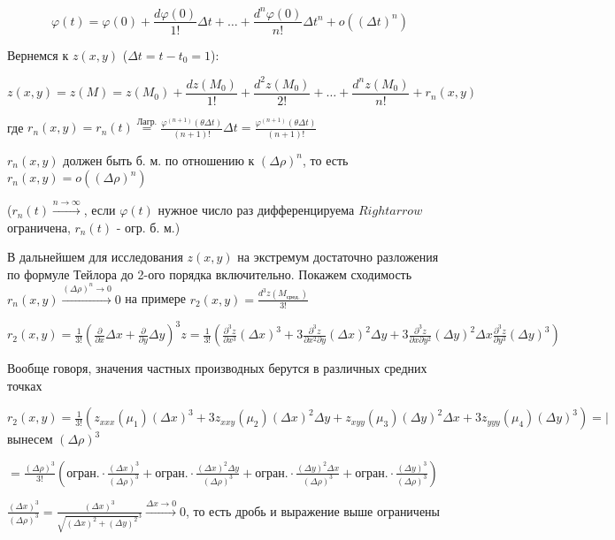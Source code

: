 \documentclass[12pt]{article}
\begin{document}
    \[\varphi(t) = \varphi(0) + \frac{d\varphi(0)}{1!} \Delta t + \dots + \frac{d^{n}\varphi(0)}{n!} \Delta t^n + o((\Delta t)^n)\]

    Вернемся к $z(x, y)$ ($\Delta t = t - t_0 = 1$):

    \[z(x, y) = z(M) = z(M_0) + \frac{dz(M_0)}{1!} + \frac{d^2 z(M_0)}{2!} + \dots + \frac{d^n z(M_0)}{n!} + r_n(x, y)\]

    где $r_n(x, y) = r_n(t) \stackrel{\text{Лагр.}}{=} \frac{\varphi^{(n+1)}(\theta \Delta t)}{(n + 1)!} \Delta t = \frac{\varphi^{(n+1)}(\theta \Delta t)}{(n + 1)!}$

    $r_n(x, y)$ должен быть б. м. по отношению к $(\Delta \rho)^n$, то есть $r_n(x, y) = o((\Delta \rho)^n)$

    ($r_n(t) \stackrel{n \to \infty}{\rightarrow}$, если $\varphi(t)$ нужное число раз дифференцируема $Rightarrow$ ограничена, $r_n(t)$ - огр. б. м.)

    \Nota В дальнейшем для исследования $z(x, y)$ на экстремум достаточно разложения по формуле Тейлора до 2-ого порядка включительно.
    Покажем сходимость $r_n(x, y) \stackrel{(\Delta \rho)^n \to 0}{\rightarrow} 0$ на примере $\displaystyle r_2 (x, y) = \frac{d^3 z(M_{\text{сред.}})}{3!}$


    $r_2(x, y) = \frac{1}{3!} \left(\frac{\partial}{\partial x} \Delta x + \frac{\partial}{\partial y} \Delta y\right)^3 z =
    \frac{1}{3!} \left(\frac{\partial^3 z}{\partial x^3} (\Delta x)^3 + 3 \frac{\partial^3 z}{\partial x^2 \partial y} (\Delta x)^2 \Delta y +
    3 \frac{\partial^3 z}{\partial x \partial y^2} (\Delta y)^2 \Delta x \frac{\partial^3 z}{\partial y^3} (\Delta y)^3\right)$

    Вообще говоря, значения частных производных берутся в различных средних точках

    $r_2(x, y) = \frac{1}{3!} (z_{xxx}(\mu_1)(\Delta x)^3 + 3 z_{xxy}(\mu_2)(\Delta x)^2 \Delta y + z_{xyy}(\mu_3)(\Delta y)^2 \Delta x + 3 z_{yyy}(\mu_4)(\Delta y)^3) = \Big|$ вынесем $(\Delta \rho)^3$

    $= \frac{(\Delta \rho)^3}{3!} \left(\text{огран.} \cdot \frac{(\Delta x)^3}{(\Delta \rho)^3} + \text{огран.} \cdot \frac{(\Delta x)^2 \Delta y}{(\Delta \rho)^3} + \text{огран.} \cdot \frac{(\Delta y)^2 \Delta x}{(\Delta \rho)^3} + \text{огран.} \cdot \frac{(\Delta y)^3}{(\Delta \rho)^3}\right)$

    $\frac{(\Delta x)^3}{(\Delta \rho)^3} = \frac{(\Delta x)^3}{\sqrt{(\Delta x)^2 + (\Delta y)^2}^3} \stackrel{\Delta x \to 0}{\rightarrow} 0$, то есть дробь и выражение выше ограничены
\end{document}
